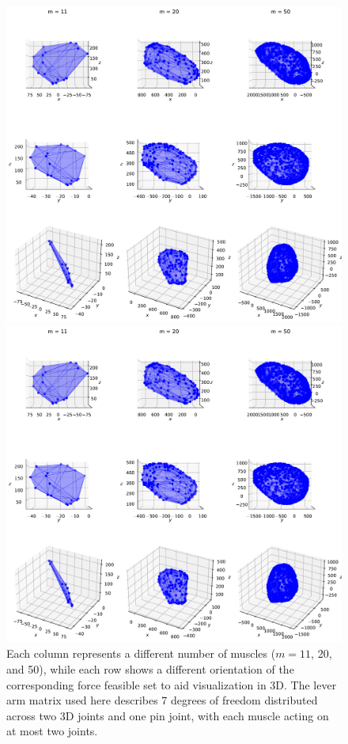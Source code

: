 \begin{figure}[!htb]
\begin{minipage}{1\linewidth}
    \end{minipage}
    \begin{minipage}{1\linewidth}
        \centering
        \includegraphics[trim={0 255 0 300},clip, width=0.9\linewidth]{img/chapter_3/zonotopes_looks_like_ellipsoids_2.pdf}
    \end{minipage}
    \begin{minipage}{1\linewidth}
        \centering
        \includegraphics[trim={0 0 0 500},clip, width=0.9\linewidth]{img/chapter_3/zonotopes_looks_like_ellipsoids_2.pdf}
    \end{minipage}
    
    \caption{Each column represents a different number of muscles ($m = 11$, 20, and 50), while each row shows a different orientation of the corresponding force feasible set to aid visualization in 3D. The lever arm matrix used here describes 7 degrees of freedom distributed across two 3D joints and one pin joint, with each muscle acting on at most two joints.}
    \label{fig:example_ellipsoidal_zonotope_bijoints}
\end{figure}

